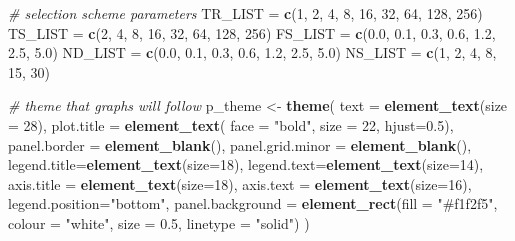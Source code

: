 \documentclass[]{book}
\newenvironment{Shaded}{\begin{snugshade}}{\end{snugshade}}
\newcommand{\CommentTok}[1]{\textcolor[rgb]{0.56,0.35,0.01}{\textit{#1}}}
\newcommand{\DataTypeTok}[1]{\textcolor[rgb]{0.13,0.29,0.53}{#1}}
\newcommand{\DecValTok}[1]{\textcolor[rgb]{0.00,0.00,0.81}{#1}}
\newcommand{\FloatTok}[1]{\textcolor[rgb]{0.00,0.00,0.81}{#1}}
\newcommand{\KeywordTok}[1]{\textcolor[rgb]{0.13,0.29,0.53}{\textbf{#1}}}
\newcommand{\NormalTok}[1]{#1}
\newcommand{\StringTok}[1]{\textcolor[rgb]{0.31,0.60,0.02}{#1}}
\begin{document}
\begin{Shaded}
\begin{Highlighting}[]
\CommentTok{# selection scheme parameters}
\NormalTok{TR_LIST =}\StringTok{ }\KeywordTok{c}\NormalTok{(}\DecValTok{1}\NormalTok{, }\DecValTok{2}\NormalTok{, }\DecValTok{4}\NormalTok{, }\DecValTok{8}\NormalTok{, }\DecValTok{16}\NormalTok{, }\DecValTok{32}\NormalTok{, }\DecValTok{64}\NormalTok{, }\DecValTok{128}\NormalTok{, }\DecValTok{256}\NormalTok{)}
\NormalTok{TS_LIST =}\StringTok{ }\KeywordTok{c}\NormalTok{(}\DecValTok{2}\NormalTok{, }\DecValTok{4}\NormalTok{, }\DecValTok{8}\NormalTok{, }\DecValTok{16}\NormalTok{, }\DecValTok{32}\NormalTok{, }\DecValTok{64}\NormalTok{, }\DecValTok{128}\NormalTok{, }\DecValTok{256}\NormalTok{)}
\NormalTok{FS_LIST =}\StringTok{ }\KeywordTok{c}\NormalTok{(}\FloatTok{0.0}\NormalTok{, }\FloatTok{0.1}\NormalTok{, }\FloatTok{0.3}\NormalTok{, }\FloatTok{0.6}\NormalTok{, }\FloatTok{1.2}\NormalTok{, }\FloatTok{2.5}\NormalTok{, }\FloatTok{5.0}\NormalTok{)}
\NormalTok{ND_LIST =}\StringTok{ }\KeywordTok{c}\NormalTok{(}\FloatTok{0.0}\NormalTok{, }\FloatTok{0.1}\NormalTok{, }\FloatTok{0.3}\NormalTok{, }\FloatTok{0.6}\NormalTok{, }\FloatTok{1.2}\NormalTok{, }\FloatTok{2.5}\NormalTok{, }\FloatTok{5.0}\NormalTok{)}
\NormalTok{NS_LIST =}\StringTok{ }\KeywordTok{c}\NormalTok{(}\DecValTok{1}\NormalTok{, }\DecValTok{2}\NormalTok{, }\DecValTok{4}\NormalTok{, }\DecValTok{8}\NormalTok{, }\DecValTok{15}\NormalTok{, }\DecValTok{30}\NormalTok{)}

\CommentTok{# theme that graphs will follow}
\NormalTok{p_theme <-}\StringTok{ }\KeywordTok{theme}\NormalTok{(}
  \DataTypeTok{text =} \KeywordTok{element_text}\NormalTok{(}\DataTypeTok{size =} \DecValTok{28}\NormalTok{),}
  \DataTypeTok{plot.title =} \KeywordTok{element_text}\NormalTok{( }\DataTypeTok{face =} \StringTok{"bold"}\NormalTok{, }\DataTypeTok{size =} \DecValTok{22}\NormalTok{, }\DataTypeTok{hjust=}\FloatTok{0.5}\NormalTok{),}
  \DataTypeTok{panel.border =} \KeywordTok{element_blank}\NormalTok{(),}
  \DataTypeTok{panel.grid.minor =} \KeywordTok{element_blank}\NormalTok{(),}
  \DataTypeTok{legend.title=}\KeywordTok{element_text}\NormalTok{(}\DataTypeTok{size=}\DecValTok{18}\NormalTok{),}
  \DataTypeTok{legend.text=}\KeywordTok{element_text}\NormalTok{(}\DataTypeTok{size=}\DecValTok{14}\NormalTok{),}
  \DataTypeTok{axis.title =} \KeywordTok{element_text}\NormalTok{(}\DataTypeTok{size=}\DecValTok{18}\NormalTok{),}
  \DataTypeTok{axis.text =} \KeywordTok{element_text}\NormalTok{(}\DataTypeTok{size=}\DecValTok{16}\NormalTok{),}
  \DataTypeTok{legend.position=}\StringTok{"bottom"}\NormalTok{,}
  \DataTypeTok{panel.background =} \KeywordTok{element_rect}\NormalTok{(}\DataTypeTok{fill =} \StringTok{"#f1f2f5"}\NormalTok{,}
                                  \DataTypeTok{colour =} \StringTok{"white"}\NormalTok{,}
                                  \DataTypeTok{size =} \FloatTok{0.5}\NormalTok{, }\DataTypeTok{linetype =} \StringTok{"solid"}\NormalTok{)}
\NormalTok{)}


\end{Highlighting}
\end{Shaded}
\end{document}
